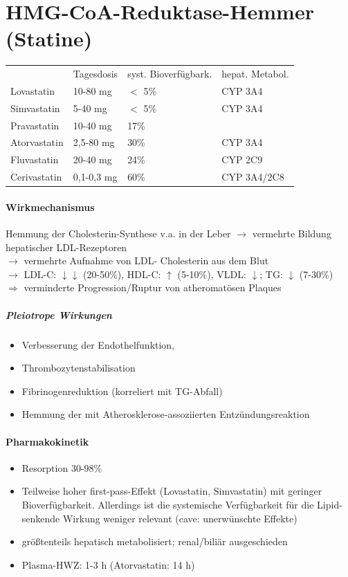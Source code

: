 \documentclass[10pt,a4paper]{report}
\begin{document}
\section{HMG-CoA-Reduktase-Hemmer (Statine)} %
\label{sec:hmg_coa_reduktase_hemmer_}
\begin{tabularx}{\textwidth}{XXXX}
&Tagesdosis&syst. Bioverfügbark.&hepat. Metabol.\\
Lovastatin&10-80 mg&$<$ 5\%&CYP 3A4\\
Simvastatin&5-40 mg&$<$ 5\%&CYP 3A4\\
Pravastatin&10-40 mg&17\%&\\
Atorvastatin&2,5-80 mg&30\%&CYP 3A4\\
Fluvastatin&20-40 mg&24\%&CYP 2C9\\
Cerivastatin&0,1-0,3 mg&60\%&CYP 3A4/2C8\\
\end{tabularx}
\paragraph{Wirkmechanismus} %
\label{par:wirkmechanismus}
Hemmung der Cholesterin-Synthese v.a. in der Leber
$\rightarrow$ vermehrte Bildung hepatischer 
	LDL-Rezeptoren \\
$\rightarrow$ vermehrte Aufnahme von LDL-
	Cholesterin aus dem Blut \\
$\rightarrow$ LDL-C: $\downarrow$$\downarrow$ (20-50\%), 
	HDL-C: $\uparrow$ (5-10\%), VLDL: $\downarrow$; 
	TG: $\downarrow$ (7-30\%) \\
$\Rightarrow$  verminderte Progression/Ruptur von
atheromatösen Plaques
\subparagraph{Pleiotrope Wirkungen} %
\label{subp:pleiotrope_wirk}
\begin{itemize}
	\item Verbesserung der Endothelfunktion,
	\item Thrombozytenstabilisation
	\item Fibrinogenreduktion (korreliert mit TG-Abfall)
	\item Hemmung der mit Atherosklerose-assoziierten Entzündungsreaktion
\end{itemize}
\paragraph{Pharmakokinetik} %
\label{par:pharmakokinetik}
\begin{itemize}
	\item Resorption 30-98\%
	\item Teilweise hoher first-pass-Effekt (Lovastatin, Simvastatin) mit geringer Bioverfügbarkeit. Allerdings ist die systemische Verfügbarkeit für die Lipid-senkende Wirkung weniger relevant (cave: unerwünschte Effekte)
	\item größtenteils hepatisch metabolisiert; renal/biliär ausgeschieden
	\item Plasma-HWZ: 1-3 h (Atorvastatin: 14 h)
\end{itemize}
\end{document}
